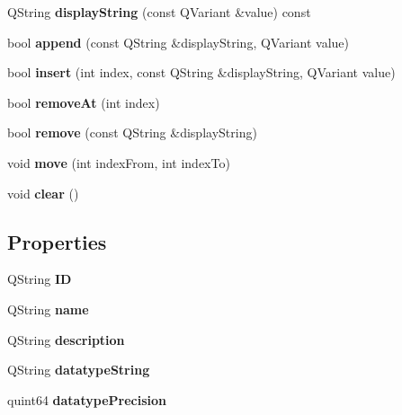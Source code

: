 \begin{DoxyCompactItemize}
Q\+String {\bfseries display\+String} (const Q\+Variant \&value) const
\item 
\mbox{\label{class_name_value_list_a77d4970fd1473cad9a8f8dc36b48f86c}} 
bool {\bfseries append} (const Q\+String \&display\+String, Q\+Variant value)
\item 
\mbox{\label{class_name_value_list_a3e17e6b80477a06bd29d47f1eb8c61db}} 
bool {\bfseries insert} (int index, const Q\+String \&display\+String, Q\+Variant value)
\item 
\mbox{\label{class_name_value_list_afa09c788f4c80bab7548c09645a6588a}} 
bool {\bfseries remove\+At} (int index)
\item 
\mbox{\label{class_name_value_list_a8b7f0c3c54edccd53bbfc07ae255a60f}} 
bool {\bfseries remove} (const Q\+String \&display\+String)
\item 
\mbox{\label{class_name_value_list_a60f3f5ad7cb231721fc440a8b3a55f4a}} 
void {\bfseries move} (int index\+From, int index\+To)
\item 
\mbox{\label{class_name_value_list_a90a930028f01ed6fa438491630e0d95e}} 
void {\bfseries clear} ()
\end{DoxyCompactItemize}
\subsection*{Properties}
\begin{DoxyCompactItemize}
\item 
\mbox{\label{class_name_value_list_ab0f9416e0c4d1baea0874ee992ff5c9a}} 
Q\+String {\bfseries ID}
\item 
\mbox{\label{class_name_value_list_af3b1881c77d99d081024b451def7b6a9}} 
Q\+String {\bfseries name}
\item 
\mbox{\label{class_name_value_list_ad5d66b2a99971770e9a11c18c600756c}} 
Q\+String {\bfseries description}
\item 
\mbox{\label{class_name_value_list_af24e13432d72d80d56c78110c15443ba}} 
Q\+String {\bfseries datatype\+String}
\item 
\mbox{\label{class_name_value_list_a9b4d7fddac1f6c7ade84aeac600ed686}} 
quint64 {\bfseries datatype\+Precision}
\end{DoxyCompactItemize}



